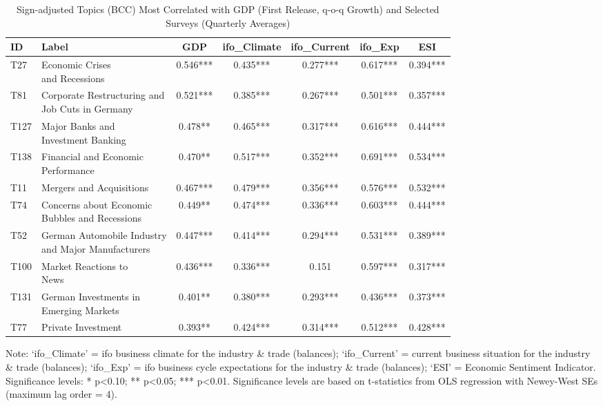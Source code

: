 \begin{table}[h!]
  \centering
  \begin{threeparttable}
    \footnotesize
    \renewcommand{\arraystretch}{1.3}
  \caption{Sign-adjusted Topics (BCC) Most Correlated with GDP (First Release, q-o-q Growth) and Selected Surveys (Quarterly Averages)}
  \label{tab:cor_gdp_topics_bcc_2009_200_all_quarterly}


\begin{tabular}{llccccc}
\hline
ID & Label & GDP & ifo\_Climate & ifo\_Current & ifo\_Exp & ESI\\
\hline
T27 & \makecell[tl]{ Economic Crises \\ and Recessions} & 0.546*** & 0.435*** & 0.277*** & 0.617*** & 0.394***\\
T81 & \makecell[tl]{ Corporate Restructuring and \\ Job Cuts in Germany} & 0.521*** & 0.385*** & 0.267*** & 0.501*** & 0.357***\\
T127 & \makecell[tl]{ Major Banks and \\ Investment Banking} & 0.478** & 0.465*** & 0.317*** & 0.616*** & 0.444***\\
T138 & \makecell[tl]{ Financial and Economic \\ Performance} & 0.470** & 0.517*** & 0.352*** & 0.691*** & 0.534***\\
T11 & Mergers and Acquisitions & 0.467*** & 0.479*** & 0.356*** & 0.576*** & 0.532***\\
\addlinespace
T74 & \makecell[tl]{ Concerns about Economic\\ Bubbles and Recessions} & 0.449** & 0.474*** & 0.336*** & 0.603*** & 0.444***\\
T52 & \makecell[tl]{ German Automobile Industry \\ and Major Manufacturers} & 0.447*** & 0.414*** & 0.294*** & 0.531*** & 0.389***\\
T100 & \makecell[tl]{ Market Reactions to \\News} & 0.436*** & 0.336*** & 0.151 & 0.597*** & 0.317***\\
T131 & \makecell[tl]{German Investments in \\ Emerging Markets} & 0.401** & 0.380*** & 0.293*** & 0.436*** & 0.373***\\
T77 & Private Investment & 0.393** & 0.424*** & 0.314*** & 0.512*** & 0.428***\\
\hline
\end{tabular}

    \begin{tablenotes}[flushleft]
      \small \item Note: ‘ifo\_Climate’ = ifo business climate for the industry \& trade (balances); ‘ifo\_Current’ = current business situation for the industry \& trade (balances); ‘ifo\_Exp’ = ifo business cycle expectations for the industry \& trade (balances); ‘ESI’ = Economic Sentiment Indicator. Significance levels: * p<0.10; ** p<0.05; *** p<0.01. Significance levels are based on t-statistics from OLS regression with Newey-West SEs (maximum lag order = 4).
    \end{tablenotes}
  \end{threeparttable}
\end{table}

